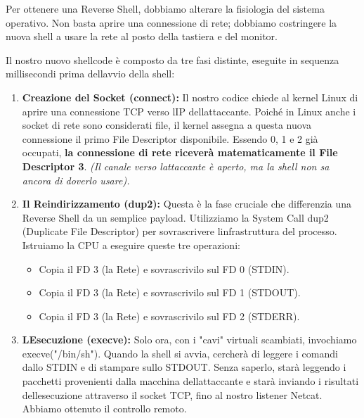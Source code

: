 \documentclass[11pt,a4paper]{article}
\begin{document}
Per ottenere una Reverse Shell, dobbiamo alterare la fisiologia del
sistema operativo. Non basta aprire una connessione di rete; dobbiamo
costringere la nuova shell a usare la rete al posto della tastiera e del
monitor.

Il nostro nuovo shellcode è composto da tre fasi distinte, eseguite in
sequenza millisecondi prima dell\textquotesingle avvio della shell:

\begin{enumerate}
\def\labelenumi{\arabic{enumi}.}
\item
  \textbf{Creazione del Socket (connect):} Il nostro codice chiede al
  kernel Linux di aprire una connessione TCP verso l\textquotesingle IP
  dell\textquotesingle attaccante. Poiché in Linux anche i socket di
  rete sono considerati file, il kernel assegna a questa nuova
  connessione il primo File Descriptor disponibile. Essendo 0, 1 e 2 già
  occupati, \textbf{la connessione di rete riceverà matematicamente il
  File Descriptor 3}. \emph{(Il canale verso
  l\textquotesingle attaccante è aperto, ma la shell non sa ancora di
  doverlo usare).}
\item
  \textbf{Il Reindirizzamento (dup2):} Questa è la fase cruciale che
  differenzia una Reverse Shell da un semplice payload. Utilizziamo la
  System Call dup2 (Duplicate File Descriptor) per sovrascrivere
  l\textquotesingle infrastruttura del processo. Istruiamo la CPU a
  eseguire queste tre operazioni:

  \begin{itemize}
  \item
    Copia il FD 3 (la Rete) e sovrascrivilo sul FD 0 (STDIN).
  \item
    Copia il FD 3 (la Rete) e sovrascrivilo sul FD 1 (STDOUT).
  \item
    Copia il FD 3 (la Rete) e sovrascrivilo sul FD 2 (STDERR).
  \end{itemize}
\item
  \textbf{L\textquotesingle Esecuzione (execve):} Solo ora, con i "cavi"
  virtuali scambiati, invochiamo execve("/bin/sh"). Quando la shell si
  avvia, cercherà di leggere i comandi dallo STDIN e di stampare sullo
  STDOUT. Senza saperlo, starà leggendo i pacchetti provenienti dalla
  macchina dell\textquotesingle attaccante e starà inviando i risultati
  dell\textquotesingle esecuzione attraverso il socket TCP, fino al
  nostro listener Netcat. Abbiamo ottenuto il controllo remoto.
\end{enumerate}
\end{document}
